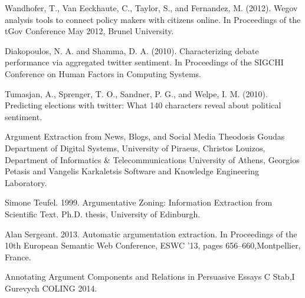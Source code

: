 \begin{thebibliography}{69}

 Wandhofer, T., Van Eeckhaute, C., Taylor, S., and Fernandez, M. (2012). Wegov analysis tools to connect policy makers with citizens online. In Proceedings of the tGov Conference May 2012, Brunel University.

 Diakopoulos, N. A. and Shamma, D. A. (2010). Characterizing debate performance via aggregated twitter sentiment. In Proceedings of the SIGCHI Conference on Human Factors in Computing Systems.

 Tumasjan, A., Sprenger, T. O., Sandner, P. G., and Welpe, I. M. (2010). Predicting elections with twitter: What 140 characters reveal about political sentiment.

 Argument Extraction from News, Blogs, and Social Media Theodosis Goudas Department of Digital Systems, University of Piraeus, Christos Louizos, Department of Informatics \& Telecommunications University of Athens, Georgios Petasis  and Vangelis Karkaletsis Software and Knowledge Engineering Laboratory.

 Simone Teufel. 1999. Argumentative Zoning: Information Extraction from Scientific Text. Ph.D. thesis, University of Edinburgh.

 Alan Sergeant. 2013. Automatic argumentation extraction. In Proceedings of the 10th European Semantic Web Conference, ESWC ’13, pages 656–660,Montpellier, France.

 Annotating Argument Components and Relations in Persuasive Essays C Stab,I Gurevych COLING 2014.


\end{thebibliography}
